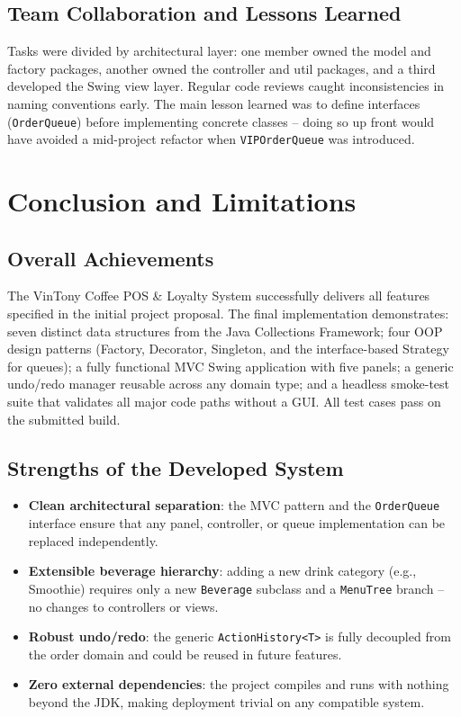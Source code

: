 \documentclass[11pt,a4paper]{article}
\begin{document}
\subsection{Team Collaboration and Lessons Learned}
Tasks were divided by architectural layer: one member owned the model and factory packages, another owned the controller and util packages, and a third developed the Swing view layer. Regular code reviews caught inconsistencies in naming conventions early. The main lesson learned was to define interfaces (\texttt{OrderQueue}) before implementing concrete classes -- doing so up front would have avoided a mid-project refactor when \texttt{VIPOrderQueue} was introduced.

\newpage

\section{Conclusion and Limitations}

\subsection{Overall Achievements}
The VinTony Coffee POS \& Loyalty System successfully delivers all features specified in the initial project proposal. The final implementation demonstrates: seven distinct data structures from the Java Collections Framework; four OOP design patterns (Factory, Decorator, Singleton, and the interface-based Strategy for queues); a fully functional MVC Swing application with five panels; a generic undo/redo manager reusable across any domain type; and a headless smoke-test suite that validates all major code paths without a GUI. All test cases pass on the submitted build.

\subsection{Strengths of the Developed System}
\begin{itemize}[leftmargin=*]
    \item \textbf{Clean architectural separation}: the MVC pattern and the \texttt{OrderQueue} interface ensure that any panel, controller, or queue implementation can be replaced independently.
    \item \textbf{Extensible beverage hierarchy}: adding a new drink category (e.g., Smoothie) requires only a new \texttt{Beverage} subclass and a \texttt{MenuTree} branch -- no changes to controllers or views.
    \item \textbf{Robust undo/redo}: the generic \texttt{ActionHistory<T>} is fully decoupled from the order domain and could be reused in future features.
    \item \textbf{Zero external dependencies}: the project compiles and runs with nothing beyond the JDK, making deployment trivial on any compatible system.
\end{itemize}
\end{document}
